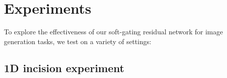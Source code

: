 
\section{Experiments}

\noindent To explore the effectiveness of our soft-gating residual network for image generation tasks, we test on a variety of settings:



\subsection{1D incision experiment}


